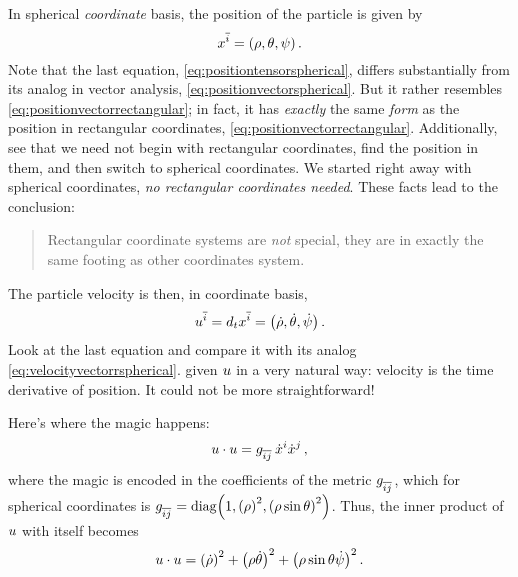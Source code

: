 \begin{solution}
  In spherical \emph{coordinate} basis, the position of the particle is given by
  \begin{equation}\label{eq:positiontensorspherical}
    \atvec\pos i = \tuple{\sxpos, \sypos, \szpos}\,.
  \end{equation}
  Note that the last equation, \cref{eq:positiontensorspherical}, differs substantially from its analog in vector analysis, \cref{eq:positionvectorspherical}. But it rather resembles \cref{eq:positionvectorrectangular}; in fact, it has \emph{exactly} the same \emph{form} as the position in rectangular coordinates, \cref{eq:positionvectorrectangular}. Additionally, see that we need not begin with rectangular coordinates, find the position in them, and then switch to spherical coordinates. We started right away with spherical coordinates, \emph{no rectangular coordinates needed}. These facts lead to the conclusion:
  \begin{quotation}
    Rectangular coordinate systems are \emph{not} special, they are in exactly the same footing as other coordinates system.
  \end{quotation}
  The particle velocity is then, in coordinate basis,
  \begin{equation}\label{eq:velocitytensorrspherical}
    \atvec\vel i = d_t\atvec\pos i
                 = \tuple{\dt\sxpos, \dt\sypos, \dt\szpos}\,.
  \end{equation}
  Look at the last equation and compare it with its analog \cref{eq:velocityvectorrspherical}.  given $u$ in a very natural way: velocity is the time derivative of position. It could not be more straightforward!
  
  Here's where the magic happens:
  \begin{equation*}
    \vel\iprod\vel = \atcovmet ij\,\tvec{\dt\pos}{i}\tvec{\dt\pos}{j}\,,
  \end{equation*}
  where the magic is encoded in the coefficients of the metric $\atcovmet ij$, which for spherical coordinates is $\atcovmet ij = \diag\tuple{1, \parens{\sxpos}^2, \parens{\sxpos\sin\sypos}^2}$. Thus, the inner product of $u$ with itself becomes
  \begin{equation*}
    \vel\iprod\vel = \parens{\dt\sxpos}^2 + \parens{\sxpos\dt\sypos}^2 + \parens{\sxpos\sin\sypos\dt\szpos}^2\,.
  \end{equation*}
\end{solution}


